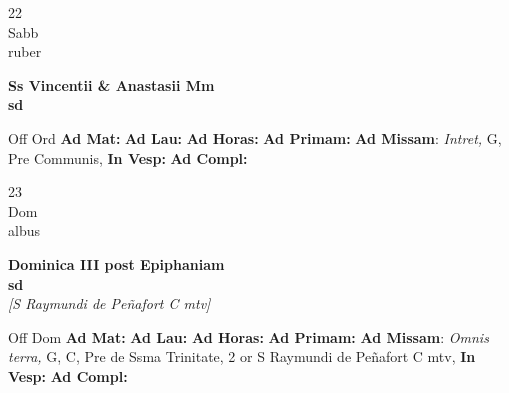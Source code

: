 \documentclass[10pt, openany]{book}
\begin{document}
        \begin{center}
            \begin{minipage}{3.5in}
                \vspace{2em}
                \begin{minipage}{0.5in}
                    {\Huge 22} \\
                    {\normalsize Sabb} \\
                    {\normalsize ruber}
                \end{minipage}
                \begin{minipage}{3.0in}
                    \textbf{ \large Ss Vincentii \& Anastasii Mm \\
                    \textnormal{\normalsize sd}} \\ 
                \end{minipage}
                \begin{justify}Off Ord
                    \textbf{Ad Mat: }
                    \textbf{Ad Lau: }
                    \textbf{Ad Horas: }
                    \textbf{Ad Primam: }\textbf{Ad Missam}: \textit{Intret,} G, Pre Communis,  
                    \textbf{In Vesp: }
                    \textbf{Ad Compl: }
                \end{justify}
            \end{minipage}
        \end{center}
    
        \begin{center}
            \begin{minipage}{3.5in}
                \vspace{2em}
                \begin{minipage}{0.5in}
                    {\Huge 23} \\
                    {\normalsize Dom} \\
                    {\normalsize albus}
                \end{minipage}
                \begin{minipage}{3.0in}
                    \textbf{ \large Dominica III post Epiphaniam \\
                    \textnormal{\normalsize sd}} \\ \textit{[S Raymundi de Peñafort C mtv]} \\ 
                \end{minipage}
                \begin{justify}Off Dom
                    \textbf{Ad Mat: }
                    \textbf{Ad Lau: }
                    \textbf{Ad Horas: }
                    \textbf{Ad Primam: }\textbf{Ad Missam}: \textit{Omnis terra,} G, C, Pre de Ssma Trinitate, 2 or S Raymundi de Peñafort C mtv,  
                    \textbf{In Vesp: }
                    \textbf{Ad Compl: }
                \end{justify}
            \end{minipage}
        \end{center}
    
\end{document}
